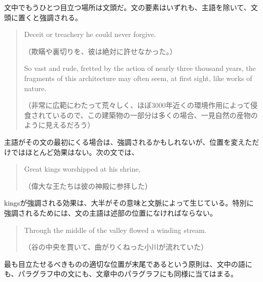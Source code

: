 文中でもうひとつ目立つ場所は文頭だ。文の要素はいずれも、主語を除いて、文頭に置くと強調される。
\begin{quote}
    Deceit or treachery he could never forgive.
    
    （欺瞞や裏切りを、彼は絶対に許せなかった。）
    
    So vast and rude, fretted by the action of nearly three thousand
years, the fragments of this architecture may often seem, at first
sight, like works of nature.

（非常に広範にわたって荒々しく、ほぼ3000年近くの環境作用によって侵食されているので、この建築物の一部分は多くの場合、一見自然の産物のように見えるだろう）
\end{quote}
主語がその文の最初にくる場合は、強調されるかもしれないが、位置を変えただけではほとんど効果はない。次の文では、
\begin{quote}
    Great kings worshipped at his shrine,
    
    （偉大な王たちは彼の神殿に参拝した）
\end{quote}
kingsが強調される効果は、大半がその意味と文脈によって生じている。特別に強調されるためには、文の主語は述部の位置になければならない。
\begin{quote}
    Through the middle of the valley flowed a winding stream.
    
    （谷の中央を貫いて、曲がりくねった小川が流れていた）
\end{quote}
最も目立たせるべきものの適切な位置が末尾であるという原則は、文中の語にも、パラグラフ中の文にも、文章中のパラグラフにも同様に当てはまる。
